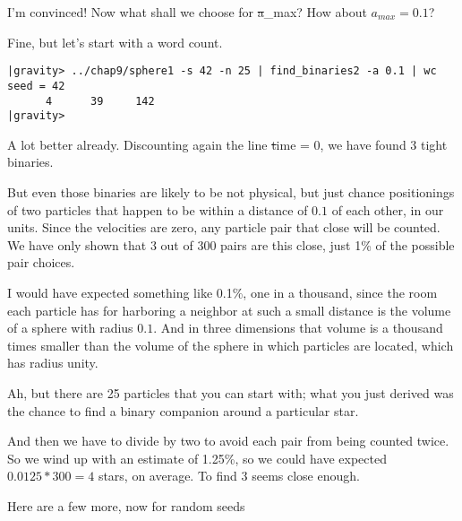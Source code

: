 \abc

\bob
I'm convinced!  Now what shall we choose for {\st a\_max}?  How about
$a_{max} = 0.1$?

\carol
Fine, but let's start with a word count.

\cba

\begin{small}
\begin{verbatim}
|gravity> ../chap9/sphere1 -s 42 -n 25 | find_binaries2 -a 0.1 | wc
seed = 42
      4      39     142
|gravity> 
\end{verbatim}
\end{small}

\abc

\bob
A lot better already.  Discounting again the line {\st time = 0}, we
have found 3 tight binaries.

\alice
But even those binaries are likely to be not physical, but just chance
positionings of two particles that happen to be within a distance of
$0.1$ of each other, in our units.  Since the velocities are zero, any
particle pair that close will be counted.  We have only shown that 3
out of 300 pairs are this close, just 1\% of the possible pair choices.

\bob
I would have expected something like 0.1\%, one in a thousand, since
the room each particle has for harboring a neighbor at such a small
distance is the volume of a sphere with radius $0.1$.  And in three
dimensions that volume is a thousand times smaller than the volume of
the sphere in which particles are located, which has radius unity.

\carol
Ah, but there are 25 particles that you can start with; what you just
derived was the chance to find a binary companion around a particular
star.

\alice
And then we have to divide by two to avoid each pair from being
counted twice.  So we wind up with an estimate of 1.25\%, so we could
have expected $0.0125*300=4$ stars, on average.  To find 3 seems close
enough.

\bob
Here are a few more, now for random seeds

\cba

